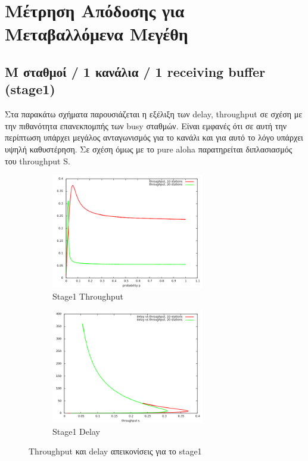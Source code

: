 \documentclass[12pt]{report}
\begin{document}
\section{Μέτρηση Απόδοσης για Μεταβαλλόμενα Μεγέθη}
\subsection{\textlatin{M} σταθμοί / 1 κανάλια / 1 \textlatin{receiving buffer} (\textlatin{stage1})}
Στα παρακάτω σχήματα παρουσιάζεται η εξέλιξη των \textlatin{delay, throughput} σε σχέση με την πιθανότητα επανεκπομπής των \textlatin{busy} σταθμών. Είναι εμφανές ότι σε αυτή την περίπτωση υπάρχει μεγάλος ανταγωνισμός για το κανάλι και για αυτό το λόγο υπάρχει υψηλή καθυστέρηση. Σε σχέση όμως με το \textlatin{pure aloha} παρατηρείται διπλασιασμός του \textlatin{throughput S}.
\begin{figure}[h]
\begin{subfigure}{0.5\textwidth}
\includegraphics[width=0.9\linewidth, height=5cm]{st1_throughput} 
\caption{\textlatin{Stage1 Throughput}}
\label{fig:st1_throughput}
\end{subfigure}
\begin{subfigure}{0.5\textwidth}
\includegraphics[width=0.9\linewidth, height=5cm]{st1_delay}
\caption{\textlatin{Stage1 Delay}}
\label{fig:st1_delay}
\end{subfigure}
 
\caption{\textlatin{Throughput} και \textlatin{delay} απεικονίσεις για το \textlatin{stage1}}
\label{fig:Stage1}
\end{figure}
\end{document}
